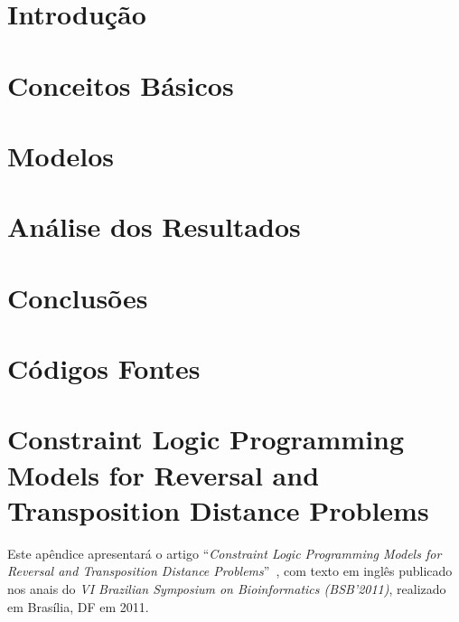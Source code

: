 \documentclass[12pt]{report} %
\begin{document}
\finalversiontrue %
%
\tablespagetrue %
%
\figurespagetrue %
%

\beforepreface







\afterpreface %

\chapter{Introdução}
\label{cap:intro}


\chapter{Conceitos Básicos}
\label{cap:basic}


\chapter{Modelos}
\label{cap:model}


\chapter{Análise dos Resultados}
\label{cap:resul}


\chapter{Conclusões}
\label{cap:concl}


\appendix

\chapter{Códigos Fontes}
\label{app:src_code}


\chapter[CLP Models for Reversal and Transposition Distance
Problems]{Constraint Logic Programming Models for Reversal and
Transposition Distance Problems}
\label{app:artigo}
Este apêndice apresentará o artigo ``\textit{Constraint Logic
Programming Models for Reversal and Transposition Distance
Problems}''~\cite{IizukaDias*2011}, com texto em inglês publicado nos
anais do \textit{VI Brazilian Symposium on Bioinformatics (BSB'2011)},
realizado em Brasília, DF em 2011.
\end{document}
